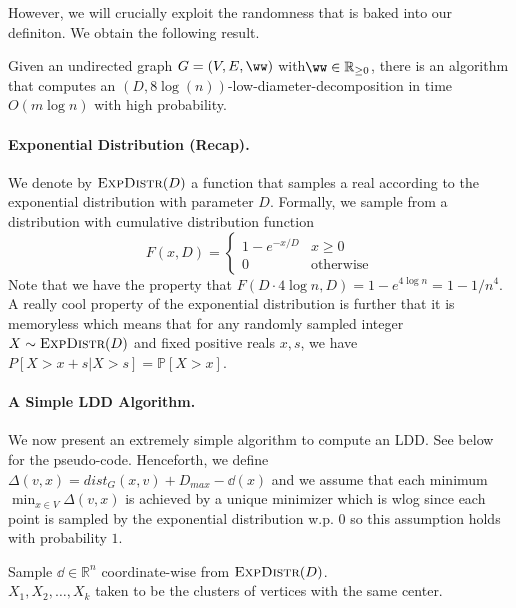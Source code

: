 However, we will crucially exploit the randomness that is baked into our definiton. We obtain the following result.

\begin{theorem}
Given an undirected graph $G = (V,E,\ww)$ with$\ww \in \mathbb{R}_{\geq 0}$, there is an algorithm that computes an $(D,  8 \log(n))$-low-diameter-decomposition in time $O(m \log n)$ with high probability. 
\end{theorem}

\paragraph{Exponential Distribution (Recap).} We denote by $\textsc{ExpDistr}(D)$ a function that samples a real according to the exponential distribution with parameter $D$.  Formally, we sample from a distribution with cumulative distribution function
\[
	F(x, D) = \begin{cases} 1 - e^{-x/D} & x \geq 0 \\ 0 & \text{otherwise} \end{cases}
\]
Note that we have the property that $F(D \cdot 4\log n,  D) = 1 - e^{4\log n} = 1-1/n^4$.  A really cool property of the exponential distribution is further that it is memoryless which means that for any randomly sampled integer $X \sim \textsc{ExpDistr}(D)$ and fixed positive reals $x,s$, we have $P[X > x + s | X > s] = \mathbb{P}[X > x]$.

\paragraph{A Simple LDD Algorithm.} We now present an extremely simple algorithm to compute an LDD.  See below for the pseudo-code.  Henceforth, we define $\Delta(v, x) = dist_G(x, v) + D_{max} - \dd(x)$ and we assume that each minimum $\min_{x \in V} \Delta(v,x)$ is achieved by a unique minimizer which is wlog since each point is sampled by the exponential distribution w.p. $0$ so this assumption holds with probability $1$.

\begin{algorithm}
Sample $\dd \in \mathbb{R}^n$ coordinate-wise from $\textsc{ExpDistr}(D)$.\\
\Return $X_1, X_2, \ldots, X_k$ taken to be the clusters of vertices with the same center.
\caption{$\textsc{ComputeLDD}(G, D)$}
\label{alg:LDD}
\end{algorithm}


